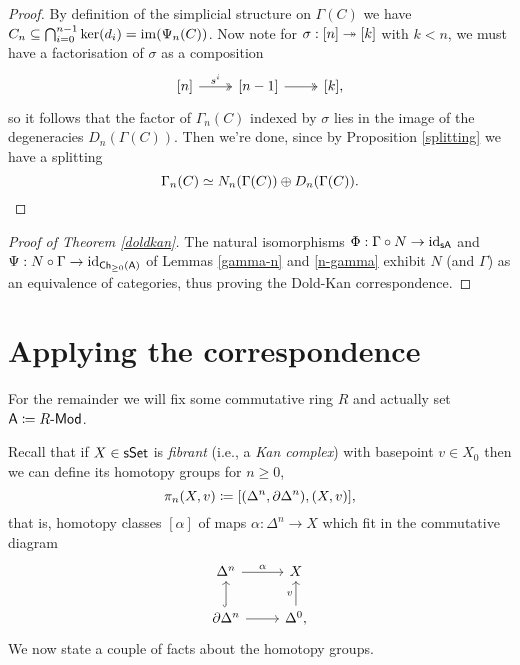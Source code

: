 \begin{proof}
  By definition of the simplicial structure on $\Gamma(C)$ we have
  $C_n \subseteq \bigcap_{i=0}^{n-1} \ker(d_i) = \operatorname{im}(\Psi_n(C))$. Now
  note for $\sigma : [n] \twoheadrightarrow [k]$ with $k < n$, we must have a
  factorisation of $\sigma$ as a composition
  \[
  \begin{tikzcd}
    {[n]} \ar[twoheadrightarrow]{r}{s^i} & {[n-1]}
    \ar[twoheadrightarrow]{r} & {[k]},
  \end{tikzcd}
  \]
  so it follows that the factor of $\Gamma_n(C)$ indexed by $\sigma$
  lies in the image of the degeneracies $D_n(\Gamma(C))$. Then we're
  done, since by Proposition \ref{splitting} we have a splitting
  \[
  \Gamma_n(C) \simeq N_n(\Gamma(C)) \oplus D_n(\Gamma(C)). \qedhere
  \]
\end{proof}

\begin{proof}[Proof of Theorem \ref{doldkan}]
  The natural isomorphisms $\Phi : \Gamma \circ N \to \operatorname{id}_{\mathsf{s}\mathsf{A}}$ and
  $\Psi : N \circ \Gamma \to \operatorname{id}_{\mathsf{Ch}_{\ge 0}(\mathsf{A})}$ of Lemmas
  \ref{gamma-n} and \ref{n-gamma} exhibit $N$ (and $\Gamma$) as an
  equivalence of categories, thus proving the Dold-Kan correspondence.
\end{proof}


\section{Applying the correspondence}

\begin{situation}
  For the remainder we will fix some commutative ring $R$ and actually
  set $\mathsf{A} \coloneqq R\text{-}\mathsf{Mod}$.
\end{situation}

Recall that if $X \in \mathsf{s}\mathsf{Set}$ is \textit{fibrant} (i.e., a \textit{Kan
  complex}) with basepoint $v \in X_0$ then we can define its homotopy
groups for $n \ge 0$,
\[
\pi_n(X,v) \coloneqq [(\Delta^n, \partial\Delta^n), (X,v)],
\]
that is, homotopy classes $[\alpha]$ of maps $\alpha : \Delta^n \to X$
which fit in the commutative diagram
\[
\begin{tikzcd}
  \Delta^n \rar{\alpha} & X \\ \del\Delta^n \ar[hookrightarrow]{u} \rar
    & \Delta^0 \uar{v},
\end{tikzcd}
\]
We now state a couple of facts about the homotopy groups.

